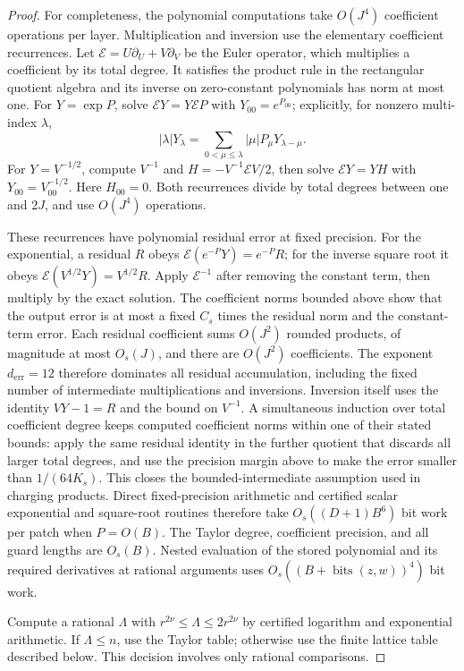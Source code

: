 \begin{proof}
For completeness, the polynomial computations take
$O(J^4)$ coefficient operations per layer. Multiplication and
inversion use the elementary coefficient recurrences.
Let $\mathcal E=U\partial_U+V\partial_V$ be the Euler
operator, which multiplies a coefficient by its total degree.
It satisfies the product rule in the rectangular quotient
algebra and its inverse on zero-constant polynomials has norm
at most one. For $Y=\exp P$, solve
$\mathcal EY=Y\mathcal EP$ with $Y_{00}=e^{P_{00}}$;
explicitly, for nonzero multi-index $\lambda$,
\[
 |\lambda|Y_\lambda
 =\sum_{0<\mu\le\lambda}|\mu|P_\mu Y_{\lambda-\mu}.
\]
For $Y=V^{-1/2}$, compute $V^{-1}$ and
$H=-V^{-1}\mathcal EV/2$, then solve
$\mathcal EY=YH$ with $Y_{00}=V_{00}^{-1/2}$.
Here $H_{00}=0$. Both recurrences divide by total degrees
between one and $2J$, and use $O(J^4)$ operations.

These recurrences have polynomial residual error at fixed
precision. For the exponential, a residual $R$ obeys
$\mathcal E(e^{-P}Y)=e^{-P}R$; for the inverse square root
it obeys $\mathcal E(V^{1/2}Y)=V^{1/2}R$.
Apply $\mathcal E^{-1}$ after removing the constant term,
then multiply by the exact solution. The coefficient norms
bounded above show that the output error is at most a fixed
$C_s$ times the residual norm and the constant-term error.
Each residual coefficient sums $O(J^2)$ rounded products,
of magnitude at most $O_s(J)$, and there are $O(J^2)$
coefficients. The exponent $d_{\mathrm{err}}=12$ therefore dominates all
residual accumulation, including the fixed number of
intermediate multiplications and inversions. Inversion itself
uses the identity $VY-1=R$ and the bound on $V^{-1}$.
A simultaneous induction over total coefficient degree keeps
computed coefficient norms within one of their stated bounds:
apply the same residual identity in the further quotient that
discards all larger total degrees, and use the precision margin
above to make the error smaller than $1/(64K_s)$. This closes
the bounded-intermediate assumption used in charging products.
Direct fixed-precision arithmetic and certified scalar
exponential and square-root routines therefore take
$O_s((D+1)B^6)$ bit work per patch when $P=O(B)$.
The Taylor degree, coefficient precision, and all guard lengths
are $O_s(B)$. Nested evaluation of the stored polynomial and
its required derivatives at rational arguments uses
$O_s((B+\operatorname{bits}(z,w))^4)$ bit work.

Compute a rational $\Lambda$ with
$r^{2\nu}\le\Lambda\le2r^{2\nu}$ by certified logarithm
and exponential arithmetic. If $\Lambda\le n$, use the Taylor
table; otherwise use the finite lattice table described below.
This decision involves only rational comparisons.


\end{proof}
